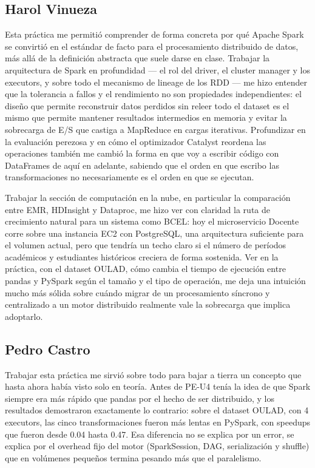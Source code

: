 \documentclass[11pt,a4paper]{article}
\begin{document}
\subsection*{Harol Vinueza}

Esta práctica me permitió comprender de forma concreta por qué Apache Spark
se convirtió en el estándar de facto para el procesamiento distribuido de
datos, más allá de la definición abstracta que suele darse en clase. Trabajar
la arquitectura de Spark en profundidad --- el rol del driver, el cluster
manager y los executors, y sobre todo el mecanismo de lineage de los RDD ---
me hizo entender que la tolerancia a fallos y el rendimiento no son
propiedades independientes: el diseño que permite reconstruir datos perdidos
sin releer todo el dataset es el mismo que permite mantener resultados
intermedios en memoria y evitar la sobrecarga de E/S que castiga a MapReduce
en cargas iterativas. Profundizar en la evaluación perezosa y en cómo el
optimizador Catalyst reordena las operaciones también me cambió la forma en
que voy a escribir código con DataFrames de aquí en adelante, sabiendo que el
orden en que escribo las transformaciones no necesariamente es el orden en
que se ejecutan.

Trabajar la sección de computación en la nube, en particular la comparación
entre EMR, HDInsight y Dataproc, me hizo ver con claridad la ruta de
crecimiento natural para un sistema como BCEL: hoy el microservicio Docente
corre sobre una instancia EC2 con PostgreSQL, una arquitectura suficiente
para el volumen actual, pero que tendría un techo claro si el número de
períodos académicos y estudiantes históricos creciera de forma sostenida. Ver
en la práctica, con el dataset OULAD, cómo cambia el tiempo de ejecución
entre pandas y PySpark según el tamaño y el tipo de operación, me deja una
intuición mucho más sólida sobre cuándo migrar de un procesamiento síncrono y
centralizado a un motor distribuido realmente vale la sobrecarga que implica
adoptarlo.

\subsection*{Pedro Castro}
Trabajar esta práctica me sirvió sobre todo para bajar a tierra un concepto que hasta ahora había visto solo en teoría. Antes de PE-U4 tenía la idea de que Spark siempre era más rápido que pandas por el hecho de ser distribuido, y los resultados demostraron exactamente lo contrario: sobre el dataset OULAD, con 4 executors, las cinco transformaciones fueron más lentas en PySpark, con speedups que fueron desde 0.04 hasta 0.47. Esa diferencia no se explica por un error, se explica por el overhead fijo del motor (SparkSession, DAG, serialización y shuffle) que en volúmenes pequeños termina pesando más que el paralelismo.
\end{document}
